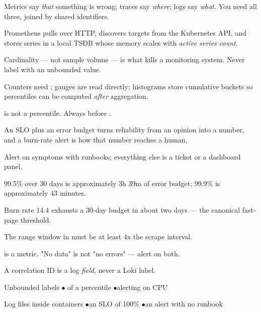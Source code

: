
\begin{tickcheck}
  \item Metrics say \emph{that} something is wrong; traces say \emph{where}; logs say \emph{what}. You need all three, joined by shared identifiers.
  \item Prometheus pulls over HTTP, discovers targets from the Kubernetes API, and stores series in a local TSDB whose memory scales with \emph{active series count}.
  \item Cardinality --- not sample volume --- is what kills a monitoring system. Never label with an unbounded value.
  \item Counters need ; gauges are read directly; histograms store cumulative buckets so percentiles can be computed \emph{after} aggregation.
  \item {} is not a percentile. Always  before .
  \item An SLO plus an error budget turns reliability from an opinion into a number, and a burn-rate alert is how that number reaches a human.
  \item Alert on symptoms with runbooks; everything else is a ticket or a dashboard panel.
\end{tickcheck}

\begin{wbitem}
  \item 99.5\% over 30 days is approximately 3h 39m of error budget; 99.9\% is approximately 43 minutes.
  \item Burn rate 14.4 exhausts a 30-day budget in about two days --- the canonical fast-page threshold.
  \item The range window in  must be at least 4x the scrape interval.
  \item {} is a metric. "No data" is not "no errors" --- alert on both.
  \item A correlation ID is a log \emph{field}, never a Loki label.
\end{wbitem}

\begin{wbitem}
  \item Unbounded labels \quad$\bullet$\quad {} of a percentile \quad$\bullet$\quad alerting on CPU
  \item Log files inside containers \quad$\bullet$\quad an SLO of 100\% \quad$\bullet$\quad an alert with no runbook
\end{wbitem}

